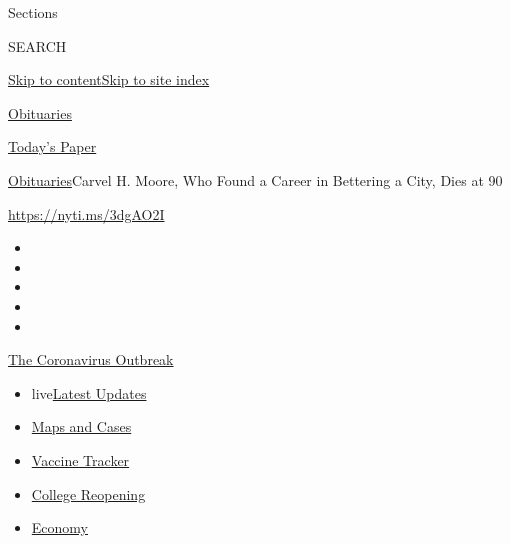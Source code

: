 Sections

SEARCH

\protect\hyperlink{site-content}{Skip to
content}\protect\hyperlink{site-index}{Skip to site index}

\href{https://www.nytimes3xbfgragh.onion/section/obituaries}{Obituaries}

\href{https://myaccount.nytimes3xbfgragh.onion/auth/login?response_type=cookie\&client_id=vi}{}

\href{https://www.nytimes3xbfgragh.onion/section/todayspaper}{Today's
Paper}

\href{/section/obituaries}{Obituaries}\textbar{}Carvel H. Moore, Who
Found a Career in Bettering a City, Dies at 90

\url{https://nyti.ms/3dgAO2I}

\begin{itemize}
\item
\item
\item
\item
\item
\end{itemize}

\href{https://www.nytimes3xbfgragh.onion/news-event/coronavirus?action=click\&pgtype=Article\&state=default\&region=TOP_BANNER\&context=storylines_menu}{The
Coronavirus Outbreak}

\begin{itemize}
\tightlist
\item
  live\href{https://www.nytimes3xbfgragh.onion/2020/08/04/world/coronavirus-covid-19.html?action=click\&pgtype=Article\&state=default\&region=TOP_BANNER\&context=storylines_menu}{Latest
  Updates}
\item
  \href{https://www.nytimes3xbfgragh.onion/interactive/2020/us/coronavirus-us-cases.html?action=click\&pgtype=Article\&state=default\&region=TOP_BANNER\&context=storylines_menu}{Maps
  and Cases}
\item
  \href{https://www.nytimes3xbfgragh.onion/interactive/2020/science/coronavirus-vaccine-tracker.html?action=click\&pgtype=Article\&state=default\&region=TOP_BANNER\&context=storylines_menu}{Vaccine
  Tracker}
\item
  \href{https://www.nytimes3xbfgragh.onion/2020/08/02/us/covid-college-reopening.html?action=click\&pgtype=Article\&state=default\&region=TOP_BANNER\&context=storylines_menu}{College
  Reopening}
\item
  \href{https://www.nytimes3xbfgragh.onion/live/2020/08/03/business/stock-market-today-coronavirus?action=click\&pgtype=Article\&state=default\&region=TOP_BANNER\&context=storylines_menu}{Economy}
\end{itemize}

